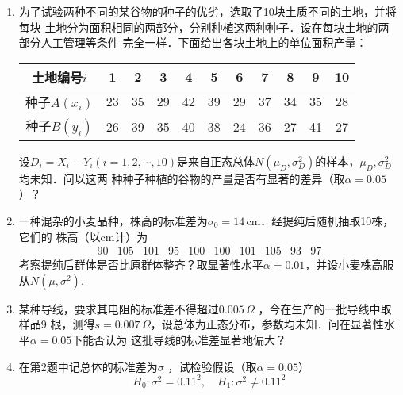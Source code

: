 \documentclass[10pt,a4paper]{article}
\begin{document}
\begin{enumerate}
    \item 为了试验两种不同的某谷物的种子的优劣，选取了10块土质不同的土地，并将每块
    土地分为面积相同的两部分，分别种植这两种种子．设在每块土地的两部分人工管理等条件
    完全一样．下面给出各块土地上的单位面积产量：
    \renewcommand{\arraystretch}{1.3}
    \begin{table}[H]\centering
        \begin{tabular}{c|cccccccccc}
        \hline
        土地编号$i$    & 1  & 2  & 3  & 4  & 5  & 6  & 7  & 8  & 9  & 10 \\ \hline
        种子$A(x_i)$ & 23 & 35 & 29 & 42 & 39 & 29 & 37 & 34 & 35 & 28 \\ \hline
        种子$B(y_i)$ & 26 & 39 & 35 & 40 & 38 & 24 & 36 & 27 & 41 & 27 \\ \hline
        \end{tabular}
    \end{table}
    \renewcommand{\arraystretch}{1.0}
    设$D_i=X_i-Y_i(i=1,2,\cdots,10)$是来自正态总体$N(\mu_D,\sigma^2_D)$的样本，$\mu_D,\sigma^2_D$均未知．问以这两
    种种子种植的谷物的产量是否有显著的差异（取$\alpha=0.05$）？




    \item 一种混杂的小麦品种，株高的标准差为$\sigma_0=14\, \mathrm{cm}$．经提纯后随机抽取10株，它们的
    株高（以cm计）为
    $$\begin{array}{cccccccccc}
        90 & 105 & 101 & 95  & 100 & 100 & 101 & 105 &  93 & 97
    \end{array}$$
    考察提纯后群体是否比原群体整齐？取显著性水平$\alpha=0.01$，并设小麦株高服从$N(\mu,\sigma^2)$.




    \item 某种导线，要求其电阻的标准差不得超过$0.005\, \Omega$ ，今在生产的一批导线中取样品9
    根，测得$s=0.007\, \Omega$，设总体为正态分布，参数均未知．问在显著性水平$\alpha=0.05$下能否认为
    这批导线的标准差显著地偏大？



    \item 在第2题中记总体的标准差为$\sigma$ ，试检验假设（取$\alpha=0.05$）
    $$H_0:\sigma^2=0.11^2,\quad H_1:\sigma^2\neq 0.11^2$$


\end{enumerate}
\end{document}
